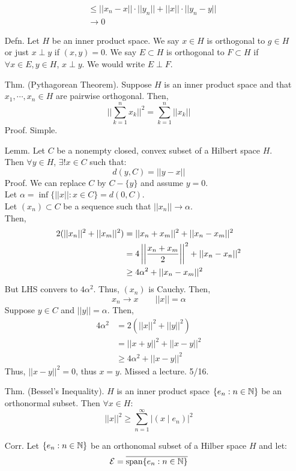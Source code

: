 \documentclass[12pt]{article}
\begin{document}
\begin{itemize}
\begin{align*}
        &\leq ||x_n-x|| \cdot ||y_n|| + ||x|| \cdot ||y_n - y|| \\
        &\to 0
    \end{align*}
    \item[Defn.] Let $H$ be an inner product space. We say $x \in H$ is orthogonal to $g \in H$ or just $x \perp y$ if $(x,y) = 0$. We say $E \subset H$ is orthogonal to $F \subset H$ if $\forall x \in E, y\in H$, $x \perp y$. We would write $E \perp F$. 
    \item[Thm.] (Pythagorean Theorem). Suppose $H$ is an inner product space and that $x_1, \cdots, x_n \in H$ are pairwise orthogonal. Then, 
    \[ ||\sum_{k=1}^n x_k||^2 = \sum_{k=1}^n ||x_k|| \] 
    Proof. Simple. 
    \item[Lemm.] Let $C$ be a nonempty closed, convex subset of a Hilbert space $H$. Then $\forall y \in H$, $\exists ! x \in C$ such that: 
    \[ d(y, C) = ||y-x|| \]
    Proof. We can replace $C$ by $C-\{y\}$ and assume $y = 0$. \\
    Let $\alpha = \inf\{||x|| : x \in C\} = d(0, C)$. \\
    Let $(x_n) \subset C$ be a sequence such that $||x_n|| \to \alpha$. \\
    Then, 
    \begin{align*}
        2(||x_n||^2 + ||x_m||^2) &= ||x_n+x_m||^2 + ||x_n-x_m||^2 \\
        &= 4\left\vert\left\vert\frac{x_n+x_m}{2}\right\vert\right\vert^2 + ||x_n-x_n||^2 \\
        &\geq 4\alpha^2 + ||x_n-x_m||^2
    \end{align*}
    But LHS convers to $4\alpha^2$. Thus, $(x_n)$ is Cauchy. Then, 
    \[ x_n \to x \qquad ||x|| = \alpha\]
    Suppose $y \in C$ and $||y|| = \alpha$. Then,
    \begin{align*}
        4\alpha^2 &= 2(||x||^2 + ||y||^2) \\
        &= ||x+y||^2 + ||x-y||^2 \\
        &\geq 4\alpha^2 + ||x-y||^2 
    \end{align*}
    Thus, $||x-y||^2 = 0$, thus $x = y$.
    \newpage 
    Missed a lecture. 5/16.
    \newpage
    \item[Thm.] (Bessel's Inequality). $H$ is an inner product space $\{e_n : n \in \mathbb N\}$ be an orthonormal subset. Then $\forall x \in H$: 
    \[ ||x||^2 \geq \sum_{n=1}^\infty |(x\mid e_n)|^2\]
    \item[Corr.] Let $\{e_n : n \in \mathbb N\}$ be an orthonomal subset of a Hilber space $H$ and let:
    \[\mathcal{E} = \overline{\operatorname{span}\{e_n : n \in \mathbb N\}}\] 

\end{itemize}
\end{document}
